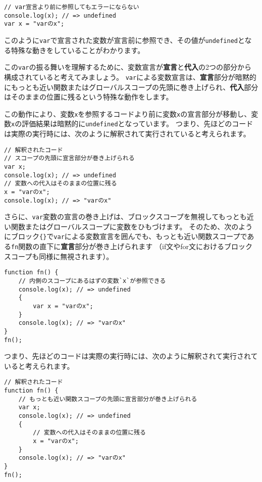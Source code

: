 \begin{lstlisting}
// var宣言より前に参照してもエラーにならない
console.log(x); // => undefined
var x = "varのx";
\end{lstlisting}

このように\texttt{var}で宣言された変数が宣言前に参照でき、その値が\texttt{undefined}となる特殊な動きをしていることがわかります。

この\texttt{var}の振る舞いを理解するために、変数宣言が\textbf{宣言}と\textbf{代入}の2つの部分から構成されていると考えてみましょう。
\texttt{var}による変数宣言は、\textbf{宣言}部分が暗黙的にもっとも近い関数またはグローバルスコープの先頭に巻き上げられ、\textbf{代入}部分はそのままの位置に残るという特殊な動作をします。

この動作により、変数\texttt{x}を参照するコードより前に変数\texttt{x}の宣言部分が移動し、変数\texttt{x}の評価結果は暗黙的に\texttt{undefined}となっています。
つまり、先ほどのコードは実際の実行時には、次のように解釈されて実行されていると考えられます。

\begin{lstlisting}
// 解釈されたコード
// スコープの先頭に宣言部分が巻き上げられる
var x;
console.log(x); // => undefined
// 変数への代入はそのままの位置に残る
x = "varのx";
console.log(x); // => "varのx"
\end{lstlisting}

さらに、\texttt{var}変数の宣言の巻き上げは、ブロックスコープを無視してもっとも近い関数またはグローバルスコープに変数をひもづけます。
そのため、次のようにブロック\texttt{\{\}}で\texttt{var}による変数宣言を囲んでも、もっとも近い関数スコープである\texttt{fn}関数の直下に\textbf{宣言}部分が巻き上げられます
（if文やfor文におけるブロックスコープも同様に無視されます）。

\begin{lstlisting}
function fn() {
    // 内側のスコープにあるはずの変数`x`が参照できる
    console.log(x); // => undefined
    {
        var x = "varのx";
    }
    console.log(x); // => "varのx"
}
fn();
\end{lstlisting}

つまり、先ほどのコードは実際の実行時には、次のように解釈されて実行されていると考えられます。

\begin{lstlisting}
// 解釈されたコード
function fn() {
    // もっとも近い関数スコープの先頭に宣言部分が巻き上げられる
    var x;
    console.log(x); // => undefined
    {
        // 変数への代入はそのままの位置に残る
        x = "varのx";
    }
    console.log(x); // => "varのx"
}
fn();
\end{lstlisting}

